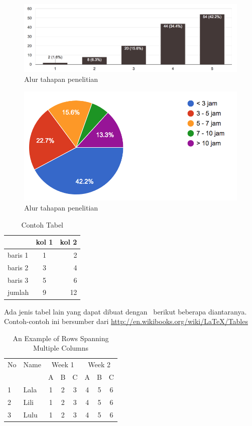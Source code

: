 \begin{figure}
	\includegraphics[width=\linewidth]{pics/tidak-suka-teori-saja}
	\caption{Alur tahapan penelitian}
	\centering
\end{figure}
\begin{figure}
	\includegraphics[width=\linewidth]{pics/waktu-bermain-game}
	\caption{Alur tahapan penelitian}
	\centering
\end{figure}

\begin{table}
	\centering
	\caption{Contoh Tabel}
	\label{tab:tab1}
	\begin{tabular}{| l | c r |}
		\hline
		& kol 1 & kol 2 \\ 
		\hline
		baris 1 & 1 & 2 \\
		baris 2 & 3 & 4 \\
		baris 3 & 5 & 6 \\
		jumlah  & 9 & 12 \\
		\hline
	\end{tabular}
\end{table}

Ada jenis tabel lain yang dapat dibuat dengan \latex~berikut 
beberapa diantaranya. 
Contoh-contoh ini bersumber dari 
\url{http://en.wikibooks.org/wiki/LaTeX/Tables}

\begin{table}
	\centering
	\caption{An Example of Rows Spanning Multiple Columns}
	\label{row.spanning}
	\begin{tabular}{|l|l|*{6}{c|}}
  		\hline %
  		No & Name & \multicolumn{3}{|c|}{Week 1} & \multicolumn{3}{|c|}{Week 2} \\
  		\cline{3-8} %
  		& & A & B & C & A & B & C\\
  		\hline
  		1 & Lala & 1 & 2 & 3 & 4 & 5 & 6\\
  		2 & Lili & 1 & 2 & 3 & 4 & 5 & 6\\
  		3 & Lulu & 1 & 2 & 3 & 4 & 5 & 6\\
  		\hline
	\end{tabular}
\end{table}

